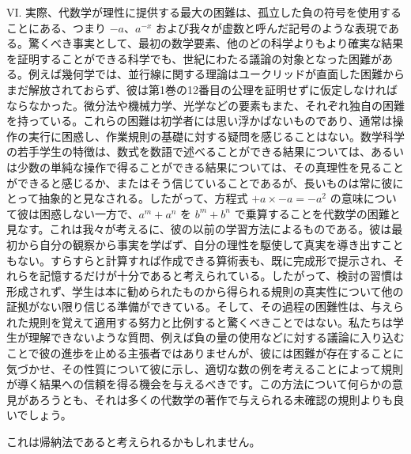 \documentclass[a4paper,11pt,openany]{ltjsbook}
\begin{document}
VI. 実際、代数学が理性に提供する最大の困難は、孤立した負の符号を使用することにある、つまり $-a$、$a^{-x}$ および我々が虚数と呼んだ記号のような表現である。驚くべき事実として、最初の数学要素、他のどの科学よりもより確実な結果を証明することができる科学でも、世紀にわたる議論の対象となった困難がある。例えば幾何学では、並行線に関する理論はユークリッドが直面した困難からまだ解放されておらず、彼は第1巻の12番目の公理を証明せずに仮定しなければならなかった。微分法や機械力学、光学などの要素もまた、それぞれ独自の困難を持っている。これらの困難は初学者には思い浮かばないものであり、通常は操作の実行に困惑し、作業規則の基礎に対する疑問を感じることはない。数学科学の若手学生の特徴は、数式を数語で述べることができる結果については、あるいは少数の単純な操作で得ることができる結果については、その真理性を見ることができると感じるか、またはそう信じていることであるが、長いものは常に彼にとって抽象的と見なされる。したがって、方程式 $+a \times -a = -a^{2}$ の意味について彼は困惑しない一方で、$a^{m} + a^{n}$ を $b^{m} + b^{n}$ で乗算することを代数学の困難と見なす。これは我々が考えるに、彼の以前の学習方法によるものである。彼は最初から自分の観察から事実を学ばず、自分の理性を駆使して真実を導き出すこともない。すらすらと計算すれば作成できる算術表も、既に完成形で提示され、それらを記憶するだけが十分であると考えられている。したがって、検討の習慣は形成されず、学生は本に勧められたものから得られる規則の真実性について他の証拠がない限り信じる準備ができている。そして、その過程の困難性は、与えられた規則を覚えて適用する努力と比例すると驚くべきことではない。私たちは学生が理解できないような質問、例えば負の量の使用などに対する議論に入り込むことで彼の進歩を止める主張者ではありませんが、彼には困難が存在することに気づかせ、その性質について彼に示し、適切な数の例を考えることによって規則が導く結果への信頼を得る機会を与えるべきです。この方法について何らかの意見があろうとも、それは多くの代数学の著作で与えられる未確認の規則よりも良いでしょう。

これは帰納法であると考えられるかもしれません。
\end{document}
